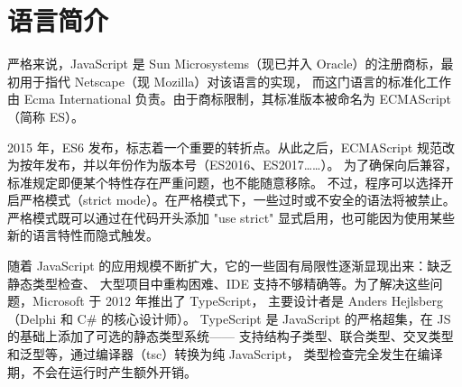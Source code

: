 \section{语言简介}
严格来说，JavaScript 是 Sun Microsystems（现已并入 Oracle）的注册商标，最初用于指代 Netscape（现 Mozilla）对该语言的实现，
而这门语言的标准化工作由 Ecma International 负责。由于商标限制，其标准版本被命名为 ECMAScript（简称 ES）。

2015 年，ES6 发布，标志着一个重要的转折点。从此之后，ECMAScript 规范改为按年发布，并以年份作为版本号（ES2016、ES2017……）。
为了确保向后兼容，标准规定即便某个特性存在严重问题，也不能随意移除。
不过，程序可以选择开启严格模式（strict mode）。在严格模式下，一些过时或不安全的语法将被禁止。
严格模式既可以通过在代码开头添加 "use strict" 显式启用，也可能因为使用某些新的语言特性而隐式触发。

随着 JavaScript 的应用规模不断扩大，它的一些固有局限性逐渐显现出来：缺乏静态类型检查、
大型项目中重构困难、IDE 支持不够精确等。为了解决这些问题，Microsoft 于 2012 年推出了 TypeScript，
主要设计者是 Anders Hejlsberg（Delphi 和 C\# 的核心设计师）。
TypeScript 是 JavaScript 的严格超集，在 JS 的基础上添加了可选的静态类型系统——
支持结构子类型、联合类型、交叉类型和泛型等，通过编译器（tsc）转换为纯 JavaScript，
类型检查完全发生在编译期，不会在运行时产生额外开销。
